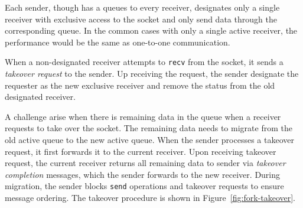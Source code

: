 Each sender, though has a queues to every receiver, designates only a single receiver with exclusive access to the socket and only send data through the corresponding queue. 
In the common cases with only a single active receiver, the performance would be the same as one-to-one communication. 

When a non-designated receiver attempts to \texttt{recv} from the socket, it sends a \textit{takeover request} to the sender. 
Up receiving the request, the sender %
designate the requester as the new exclusive receiver and remove the status from the old designated receiver. 

A challenge arise when there is remaining data in the queue when a receiver requests to take over the socket. %
The remaining data needs to migrate from the old active queue to the new active queue. When the sender processes a takeover request, it first forwards it to the current receiver. Upon receiving takeover request, the current receiver returns all remaining data to sender via \textit{takeover completion} messages, which the sender forwards to the new receiver. During migration, the sender blocks \texttt{send} operations and takeover requests to ensure message ordering. The takeover procedure is shown in Figure~\ref{fig:fork-takeover}.



